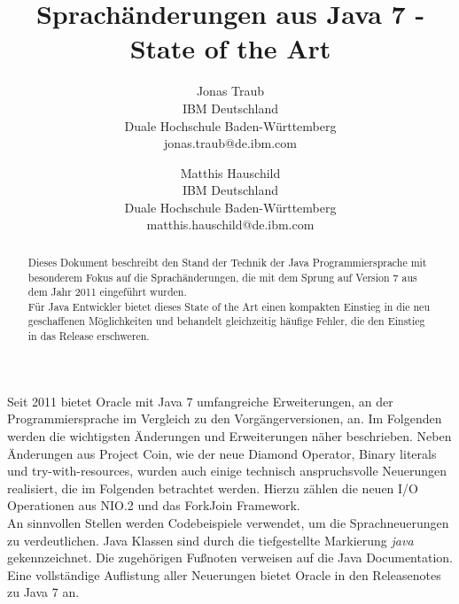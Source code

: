 \documentclass[times, 10pt,twocolumn]{article}
\begin{document}
\title{Sprachänderungen aus Java 7 - State of the Art}

\author{Jonas Traub\\
IBM Deutschland\\
Duale Hochschule Baden-Württemberg\\
jonas.traub@de.ibm.com
\and
Matthis Hauschild\\
IBM Deutschland\\
Duale Hochschule Baden-Württemberg\\
matthis.hauschild@de.ibm.com\\
}

\maketitle
\thispagestyle{empty}

\begin{abstract}
Dieses Dokument beschreibt den Stand der Technik der Java Programmiersprache mit besonderem Fokus auf die
Sprachänderungen, die mit dem Sprung auf Version 7 aus dem Jahr 2011 eingeführt wurden.\\

Für Java Entwickler bietet dieses State of the Art einen kompakten Einstieg in die neu geschaffenen Möglichkeiten und
behandelt gleichzeitig häufige Fehler, die den Einstieg in das Release erschweren.
\end{abstract}


Seit 2011 bietet Oracle mit Java 7 umfangreiche Erweiterungen, an der Programmiersprache im Vergleich zu den Vorgängerversionen, an.
Im Folgenden werden die wichtigsten Änderungen und Erweiterungen näher beschrieben. Neben Änderungen aus Project Coin,
wie der neue Diamond Operator, Binary literals und try-with-resources, wurden auch einige technisch
anspruchsvolle Neuerungen realisiert, die im Folgenden betrachtet werden. Hierzu zählen die neuen I/O Operationen aus NIO.2 und
das ForkJoin Framework.\\

An sinnvollen Stellen werden Codebeispiele verwendet, um die Sprachneuerungen zu verdeutlichen. Java Klassen sind durch die tiefgestellte
Markierung \textit{java} gekennzeichnet. Die zugehörigen Fußnoten verweisen auf die Java Documentation\cite{javadocs}. Eine 
vollständige Auflistung aller Neuerungen bietet Oracle in den Releasenotes zu Java 7\cite{oracleJavaRel} an.\\
\end{document}
